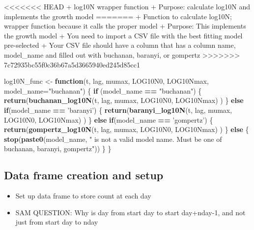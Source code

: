 \documentclass[]{article}
\newenvironment{Shaded}{\begin{snugshade}}{\end{snugshade}}
\newcommand{\ControlFlowTok}[1]{\textcolor[rgb]{0.13,0.29,0.53}{\textbf{#1}}}
\newcommand{\DataTypeTok}[1]{\textcolor[rgb]{0.13,0.29,0.53}{#1}}
\newcommand{\KeywordTok}[1]{\textcolor[rgb]{0.13,0.29,0.53}{\textbf{#1}}}
\newcommand{\NormalTok}[1]{#1}
\newcommand{\OperatorTok}[1]{\textcolor[rgb]{0.81,0.36,0.00}{\textbf{#1}}}
\newcommand{\StringTok}[1]{\textcolor[rgb]{0.31,0.60,0.02}{#1}}
\providecommand{\tightlist}{%
  \setlength{\itemsep}{0pt}\setlength{\parskip}{0pt}}
\begin{document}
\textless{}\textless{}\textless{}\textless{}\textless{}\textless{}\textless{}
HEAD + log10N wrapper function + Purpose: calculate log10N and
implements the growth model ======= + Function to calculate log10N;
wrapper function because it calls the proper model + Purpose: This
implements the growth model + You need to import a CSV file with the
best fitting model pre-selected + Your CSV file should have a column
that has a column name, model\_name and filled out with buchanan,
baranyi, or gompertz
\textgreater{}\textgreater{}\textgreater{}\textgreater{}\textgreater{}\textgreater{}\textgreater{}
7c72935bc55f0c36b67a5d3665940ed245d85cc1

\begin{Shaded}
\begin{Highlighting}[]
\NormalTok{log10N_func <-}\StringTok{ }\ControlFlowTok{function}\NormalTok{(t, lag, mumax, LOG10N0, LOG10Nmax, }\DataTypeTok{model_name=}\StringTok{"buchanan"}\NormalTok{) \{}
  \ControlFlowTok{if}\NormalTok{ (model_name }\OperatorTok{==}\StringTok{ "buchanan"}\NormalTok{) \{}
    \KeywordTok{return}\NormalTok{(}\KeywordTok{buchanan_log10N}\NormalTok{(t, lag, mumax, LOG10N0, LOG10Nmax) )}
\NormalTok{  \}}
  \ControlFlowTok{else} \ControlFlowTok{if}\NormalTok{(model_name }\OperatorTok{==}\StringTok{ 'baranyi'}\NormalTok{) \{}
    \KeywordTok{return}\NormalTok{(}\KeywordTok{baranyi_log10N}\NormalTok{(t, lag, mumax, LOG10N0, LOG10Nmax) )}
\NormalTok{  \}}
  \ControlFlowTok{else} \ControlFlowTok{if}\NormalTok{(model_name }\OperatorTok{==}\StringTok{ 'gompertz'}\NormalTok{) \{}
    \KeywordTok{return}\NormalTok{(}\KeywordTok{gompertz_log10N}\NormalTok{(t, lag, mumax, LOG10N0, LOG10Nmax) )}
\NormalTok{  \}}
  \ControlFlowTok{else}\NormalTok{ \{}
    \KeywordTok{stop}\NormalTok{(}\KeywordTok{paste0}\NormalTok{(model_name, }\StringTok{" is not a valid model name. Must be one of buchanan, baranyi, gompertz"}\NormalTok{))}
\NormalTok{  \}}
\NormalTok{\}}
\end{Highlighting}
\end{Shaded}

\hypertarget{data-frame-creation-and-setup}{%
\subsection{Data frame creation and
setup}\label{data-frame-creation-and-setup}}

\begin{itemize}
\tightlist
\item
  Set up data frame to store count at each day
\item
  SAM QUESTION: Why is day from start day to start day+nday-1, and not
  just from start day to nday
\end{itemize}
\end{document}
